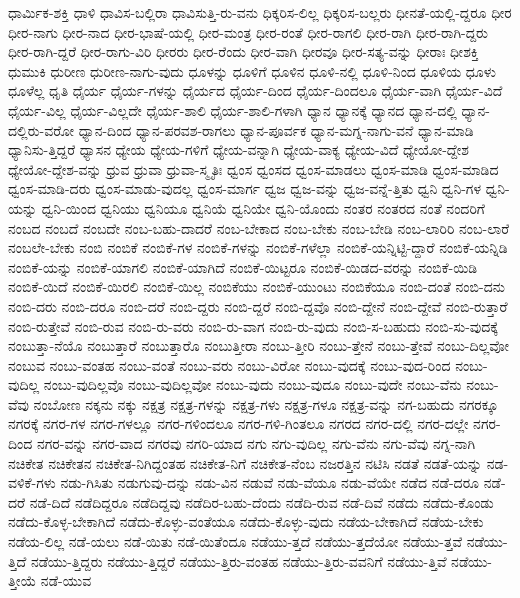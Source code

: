 {ಧಾರ್ಮಿಕ-ಶಕ್ತಿ
ಧಾಳಿ
ಧಾವಿಸ-ಬಲ್ಲಿರಾ
ಧಾವಿಸುತ್ತಿ-ರು-ವನು
ಧಿಕ್ಕರಿಸ-ಲಿಲ್ಲ
ಧಿಕ್ಕರಿಸ-ಬಲ್ಲರು
ಧೀನತೆ-ಯಲ್ಲಿ-ದ್ದರೂ
ಧೀರ
ಧೀರ-ನಾಗು
ಧೀರ-ನಾದ
ಧೀರ-ಭಾಷೆ-ಯಲ್ಲಿ
ಧೀರ-ಮಂತ್ರ
ಧೀರ-ರಂತೆ
ಧೀರ-ರಾಗಲಿ
ಧೀರ-ರಾಗಿ
ಧೀರ-ರಾಗಿ-ದ್ದರು
ಧೀರ-ರಾಗಿ-ದ್ದರೆ
ಧೀರ-ರಾಗು-ವಿರಿ
ಧೀರರು
ಧೀರ-ರೆಂದು
ಧೀರ-ವಾಗಿ
ಧೀರವೂ
ಧೀರ-ಸತ್ಯ-ವನ್ನು
ಧೀರಾಃ
ಧೀಶಕ್ತಿ
ಧುಮುಕಿ
ಧುರೀಣ
ಧುರೀಣ-ನಾಗು-ವುದು
ಧೂಳನ್ನು
ಧೂಳಿಗೆ
ಧೂಳಿನ
ಧೂಳಿ-ನಲ್ಲಿ
ಧೂಳಿ-ನಿಂದ
ಧೂಳಿಯ
ಧೂಳು
ಧೂಳೆಲ್ಲ
ಧೃತಿ
ಧೈರ್ಯ
ಧೈರ್ಯ-ಗಳನ್ನು
ಧೈರ್ಯದ
ಧೈರ್ಯ-ದಿಂದ
ಧೈರ್ಯ-ದಿಂದಲೂ
ಧೈರ್ಯ-ವಾಗಿ
ಧೈರ್ಯ-ವಿದೆ
ಧೈರ್ಯ-ವಿಲ್ಲ
ಧೈರ್ಯ-ವಿಲ್ಲದೇ
ಧೈರ್ಯ-ಶಾಲಿ
ಧೈರ್ಯ-ಶಾಲಿ-ಗಳಾಗಿ
ಧ್ಯಾನ
ಧ್ಯಾನಕ್ಕೆ
ಧ್ಯಾನದ
ಧ್ಯಾನ-ದಲ್ಲಿ
ಧ್ಯಾನ-ದಲ್ಲಿರು-ವರೋ
ಧ್ಯಾನ-ದಿಂದ
ಧ್ಯಾನ-ಪರವಶ-ರಾಗಲು
ಧ್ಯಾನ-ಪೂರ್ವಕ
ಧ್ಯಾನ-ಮಗ್ನ-ನಾಗು-ವನೆ
ಧ್ಯಾನ-ಮಾಡಿ
ಧ್ಯಾನಿಸು-ತ್ತಿದ್ದರೆ
ಧ್ಯಾಸನ
ಧ್ಯೇಯ
ಧ್ಯೇಯ-ಗಳಿಗೆ
ಧ್ಯೇಯ-ವನ್ನಾಗಿ
ಧ್ಯೇಯ-ವಾಕ್ಯ
ಧ್ಯೇಯ-ವಿದೆ
ಧ್ಯೇಯೋ-ದ್ದೇಶ
ಧ್ಯೇಯೋ-ದ್ದೇಶ-ವನ್ನು
ಧ್ರುವ
ಧ್ರುವಾ
ಧ್ರುವಾ-ಸ್ಮೃತಿಃ
ಧ್ವಂಸ
ಧ್ವಂಸದ
ಧ್ವಂಸ-ಮಾಡಲು
ಧ್ವಂಸ-ಮಾಡಿ
ಧ್ವಂಸ-ಮಾಡಿದ
ಧ್ವಂಸ-ಮಾಡಿ-ದರು
ಧ್ವಂಸ-ಮಾಡು-ವುದಲ್ಲ
ಧ್ವಂಸ-ಮಾರ್ಗ
ಧ್ವಜ
ಧ್ವಜ-ವನ್ನು
ಧ್ವಜ-ವನ್ನೆ-ತ್ತಿತು
ಧ್ವನಿ
ಧ್ವನಿ-ಗಳ
ಧ್ವನಿ-ಯನ್ನು
ಧ್ವನಿ-ಯಿಂದ
ಧ್ವನಿಯು
ಧ್ವನಿಯೂ
ಧ್ವನಿಯೆ
ಧ್ವನಿಯೇ
ಧ್ವನಿ-ಯೊಂದು
ನಂತರ
ನಂತರದ
ನಂತೆ
ನಂದರಿಗೆ
ನಂಬದ
ನಂಬದೆ
ನಂಬದೇ
ನಂಬ-ಬಹು-ದಾದರೆ
ನಂಬ-ಬೇಕಾದ
ನಂಬ-ಬೇಕು
ನಂಬ-ಬೇಡಿ
ನಂಬ-ಲಾರಿರಿ
ನಂಬ-ಲಾರೆ
ನಂಬಲೇ-ಬೇಕು
ನಂಬಿ
ನಂಬಿಕೆ
ನಂಬಿಕೆ-ಗಳ
ನಂಬಿಕೆ-ಗಳನ್ನು
ನಂಬಿಕೆ-ಗಳೆಲ್ಲಾ
ನಂಬಿಕೆ-ಯನ್ನಿಟ್ಟಿ-ದ್ದಾರೆ
ನಂಬಿಕೆ-ಯನ್ನಿಡಿ
ನಂಬಿಕೆ-ಯನ್ನು
ನಂಬಿಕೆ-ಯಾಗಲಿ
ನಂಬಿಕೆ-ಯಾಗಿದೆ
ನಂಬಿಕೆ-ಯಿಟ್ಟರೂ
ನಂಬಿಕೆ-ಯಿಡದ-ವರನ್ನು
ನಂಬಿಕೆ-ಯಿಡಿ
ನಂಬಿಕೆ-ಯಿದೆ
ನಂಬಿಕೆ-ಯಿರಲಿ
ನಂಬಿಕೆ-ಯಿಲ್ಲ
ನಂಬಿಕೆಯು
ನಂಬಿಕೆ-ಯುಂಟು
ನಂಬಿಕೆಯೂ
ನಂಬಿ-ದಂತೆ
ನಂಬಿ-ದನು
ನಂಬಿ-ದರು
ನಂಬಿ-ದರೂ
ನಂಬಿ-ದರೆ
ನಂಬಿ-ದ್ದರು
ನಂಬಿ-ದ್ದರೆ
ನಂಬಿ-ದ್ದವೊ
ನಂಬಿ-ದ್ದೇನೆ
ನಂಬಿ-ದ್ದೇವೆ
ನಂಬಿ-ರುತ್ತಾರೆ
ನಂಬಿ-ರುತ್ತೇವೆ
ನಂಬಿ-ರುವ
ನಂಬಿ-ರು-ವರು
ನಂಬಿ-ರು-ವಾಗ
ನಂಬಿ-ರು-ವುದು
ನಂಬಿ-ಸ-ಬಹುದು
ನಂಬಿ-ಸು-ವುದಕ್ಕೆ
ನಂಬುತ್ತಾ-ನೆಯೊ
ನಂಬುತ್ತಾರೆ
ನಂಬುತ್ತಾರೊ
ನಂಬುತ್ತೀರಾ
ನಂಬು-ತ್ತೀರಿ
ನಂಬು-ತ್ತೇನೆ
ನಂಬು-ತ್ತೇವೆ
ನಂಬು-ದಿಲ್ಲವೋ
ನಂಬುವ
ನಂಬು-ವಂತಹ
ನಂಬು-ವಂತೆ
ನಂಬು-ವರು
ನಂಬು-ವಿರೋ
ನಂಬು-ವುದಕ್ಕೆ
ನಂಬು-ವುದ-ರಿಂದ
ನಂಬು-ವುದಿಲ್ಲ
ನಂಬು-ವುದಿಲ್ಲವೊ
ನಂಬು-ವುದಿಲ್ಲವೋ
ನಂಬು-ವುದು
ನಂಬು-ವುದೂ
ನಂಬು-ವುದೇ
ನಂಬು-ವೆನು
ನಂಬು-ವೆವು
ನಂಬೋಣ
ನಕ್ಕನು
ನಕ್ಕು
ನಕ್ಷತ್ರ
ನಕ್ಷತ್ರ-ಗಳನ್ನು
ನಕ್ಷತ್ರ-ಗಳು
ನಕ್ಷತ್ರ-ಗಳೂ
ನಕ್ಷತ್ರ-ವನ್ನು
ನಗ-ಬಹುದು
ನಗರಕ್ಕೂ
ನಗರಕ್ಕೆ
ನಗರ-ಗಳ
ನಗರ-ಗಳಲ್ಲೂ
ನಗರ-ಗಳಿಂದಲೂ
ನಗರ-ಗಳಿ-ಗಿಂತಲೂ
ನಗರದ
ನಗರ-ದಲ್ಲಿ
ನಗರ-ದಲ್ಲೇ
ನಗರ-ದಿಂದ
ನಗರ-ವನ್ನು
ನಗರ-ವಾದ
ನಗರವು
ನಗರಿ-ಯಾದ
ನಗು
ನಗು-ವುದಿಲ್ಲ
ನಗು-ವೆನು
ನಗು-ವೆವು
ನಗ್ನ-ನಾಗಿ
ನಚಿಕೇತ
ನಚಿಕೇತನ
ನಚಿಕೇತ-ನಿಗಿದ್ದಂತಹ
ನಚಿಕೇತ-ನಿಗೆ
ನಚಿಕೇತ-ನೆಂಬ
ನಜರತ್ತಿನ
ನಟಿಸಿ
ನಡತೆ
ನಡತೆ-ಯನ್ನು
ನಡ-ವಳಿಕೆ-ಗಳು
ನಡು-ಗಿಸಿತು
ನಡುಗುವು-ದನ್ನು
ನಡು-ವಿನ
ನಡುವೆ
ನಡು-ವೆಯೂ
ನಡು-ವೆಯೇ
ನಡೆದ
ನಡೆ-ದರೂ
ನಡೆ-ದರೆ
ನಡೆ-ದಿದೆ
ನಡೆದಿದ್ದರೂ
ನಡೆದಿದ್ದವು
ನಡೆದಿರ-ಬಹು-ದೆಂದು
ನಡೆದಿ-ರುವ
ನಡೆ-ದಿವೆ
ನಡೆದು
ನಡೆದು-ಕೊಂಡು
ನಡೆದು-ಕೊಳ್ಳ-ಬೇಕಾಗಿದೆ
ನಡೆದು-ಕೊಳ್ಳು-ವಂತೆಯೂ
ನಡೆದು-ಕೊಳ್ಳು-ವುದು
ನಡೆಯ-ಬೇಕಾಗಿದೆ
ನಡೆಯ-ಬೇಕು
ನಡೆಯ-ಲಿಲ್ಲ
ನಡೆ-ಯಲು
ನಡೆ-ಯಿತು
ನಡೆ-ಯಿತೆಂದೂ
ನಡೆಯು-ತ್ತದೆ
ನಡೆಯು-ತ್ತದೆಯೋ
ನಡೆಯು-ತ್ತವೆ
ನಡೆಯು-ತ್ತಿದೆ
ನಡೆಯು-ತ್ತಿದ್ದರು
ನಡೆಯು-ತ್ತಿದ್ದರೆ
ನಡೆಯು-ತ್ತಿರು-ವಂತಹ
ನಡೆಯು-ತ್ತಿರು-ವವನಿಗೆ
ನಡೆಯು-ತ್ತಿವೆ
ನಡೆಯು-ತ್ತೀಯೆ
ನಡೆ-ಯುವ
}
